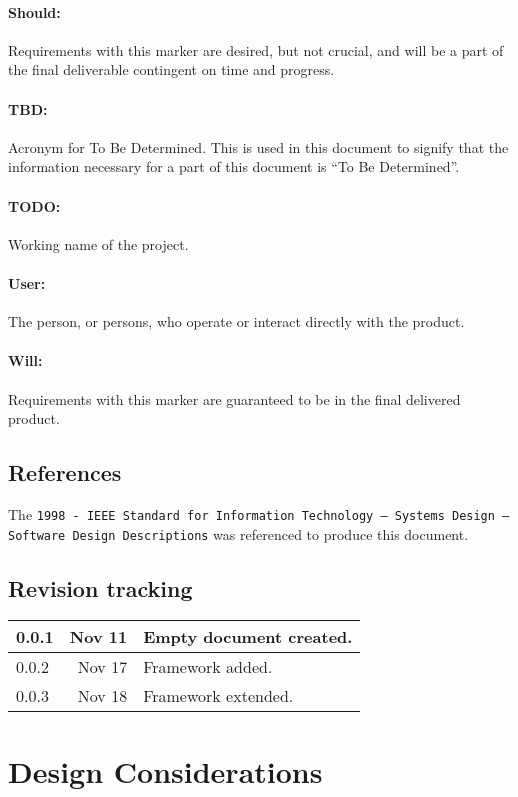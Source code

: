 \documentclass[12pt,a4paper]{article}
\begin{document}
\paragraph{Should:} Requirements with this marker are desired, but not crucial, and will be a part of the final deliverable contingent on time and progress.
\paragraph{TBD:} Acronym for To Be Determined. This is used in this document to signify that the information necessary for a part of this document is ``To Be Determined''.
\paragraph{TODO:} Working name of the project.
\paragraph{User:} The person, or persons, who operate or interact directly with the product.
\paragraph{Will:} Requirements with this marker are guaranteed to be in the final delivered product.

\subsection{References}
The {\tt 1998 - IEEE Standard for Information Technology -- Systems Design -- Software Design Descriptions} was referenced to produce this document.

\subsection{Revision tracking}
\begin{tabular}{|l|r|p{5.5in}|}
\hline
0.0.1 & Nov 11 & Empty document created.\\
\hline
0.0.2 & Nov 17 & Framework added.\\
\hline
0.0.3 & Nov 18 & Framework extended.\\
\hline
\end{tabular}

\section{Design Considerations}
\end{document}
